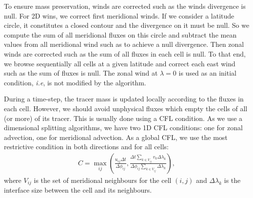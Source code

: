To ensure mass preservation, winds are corrected such as the winds divergence is
null. For 2D wins, we correct first meridional winds. If we consider a latitude
circle, it constitutes a closed contour and the divergence on it must be null.
So we compute the sum of all meridional fluxes on this circle and subtract the
mean values from all meridional wind such as to achieve a null divergence. Then
zonal winds are corrected such as the sum of all fluxes in each cell is null. To
that end, we browse sequentially all cells at a given latitude and correct each
east wind such as the sum of fluxes is null. The zonal wind at $\lambda=0$ is
used as an initial condition, \textit{i.e}, is not modified by the algorithm.

During a time-step, the tracer mass is updated locally according to the fluxes
in each cell. However, we should avoid unphysical fluxes which empty the
cells of all (or more) of its tracer. This is usually done using a \gls{CFL}
condition. As we use a dimensional splitting algorithms, we have two 1D
\gls{CFL} conditions: one for zonal advection, one for meridional advection. As
a global \gls{CFL}, we use the most restrictive condition in both directions and
for all cells:
\begin{align*} 
  C = \max_{ij} \left(\frac{u_{ij}\Delta t}{\Delta\phi_{ij}},
  \frac{\Delta t\sum_{k \in V_{ij}} v_k \Delta\lambda_k }{
    \Delta\phi_{ij}\sum_{k \in V_{ij}} \Delta\lambda_{k}} \right),
\end{align*}
where $V_{ij}$ is the set of meridional neighbours for the cell
$(i,j)$ and $\Delta\lambda_k$ is the interface size between the
cell and its neighbours.

